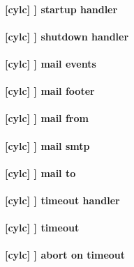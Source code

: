 \paragraph[startup handler]{[cylc] \textrightarrow [[events]] \textrightarrow startup handler}

\paragraph[shutdown handler]{[cylc] \textrightarrow [[events]] \textrightarrow shutdown handler}

\paragraph[mail events]{[cylc] \textrightarrow [[events]] \textrightarrow mail events}

\paragraph[mail footer]{[cylc] \textrightarrow [[events]] \textrightarrow mail footer}

\paragraph[mail from]{[cylc] \textrightarrow [[events]] \textrightarrow mail from}

\paragraph[mail smtp]{[cylc] \textrightarrow [[events]] \textrightarrow mail smtp}

\paragraph[mail to]{[cylc] \textrightarrow [[events]] \textrightarrow mail to}

\paragraph[timeout handler]{[cylc] \textrightarrow [[events]] \textrightarrow timeout handler}

\paragraph[timeout]{[cylc] \textrightarrow [[events]] \textrightarrow timeout}

\paragraph[abort on timeout]{[cylc] \textrightarrow [[events]] \textrightarrow abort on timeout}

